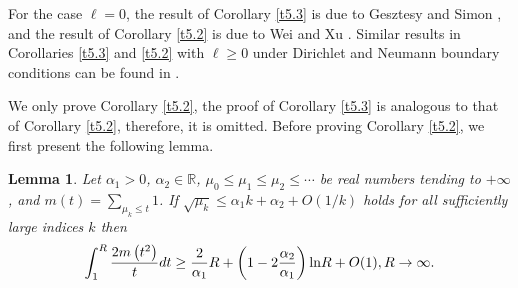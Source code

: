 \documentclass[reqno,12pt,centertags]{amsart}
\renewcommand{\ln}{\text{\rm ln}}
\numberwithin{equation}{section}
\newtheorem{lemma}[theorem]{Lemma}
\theoremstyle{definition}
\begin{document}
For the case $\ell=0$, the result of Corollary \ref{t5.3} is due to Gesztesy and Simon \cite[Theorem 1.3]{GSb2000}, and the result of Corollary \ref{t5.2} is due to Wei and Xu \cite[Theorem 4.1]{WX2012}. 
Similar results in Corollaries \ref{t5.3} and \ref{t5.2} with $\ell\geq0$ under Dirichlet and Neumann boundary conditions can be found in \cite[Theorems 4.1 and 4.2]{YGJ2019}.


We only prove Corollary \ref{t5.2}, the proof of Corollary \ref{t5.3} is analogous to that of Corollary \ref{t5.2}, therefore, it is omitted.  Before proving Corollary  \ref{t5.2}, we first present the following lemma.

\begin{lemma}\cite[Lemma 3.2]{HorvO2016}\label{l5.1}
Let $\alpha_{1}>0$, $\alpha_{2}\in\mathbb{R}$, $\mu_0 \leq \mu_1 \leq \mu_2 \leq \cdots$ be real numbers tending to $+\infty$, and $m(t)=\sum\limits_{\mu_k \leq t}1$. If $\sqrt{\mu_k} \leq \alpha_{1}k+\alpha_{2}+O(1/k)$ holds for all sufficiently large indices $k$ then
\begin{align*}
\int_1^R \frac{2 m\left(t^2\right)}{t} d t \geq \frac{2}{\alpha_{1}} R+\left(1-2 \frac{\alpha_{2}}{\alpha_{1}}\right) \ln R+O(1), R \rightarrow \infty.
\end{align*}
\end{lemma}
\end{document}
